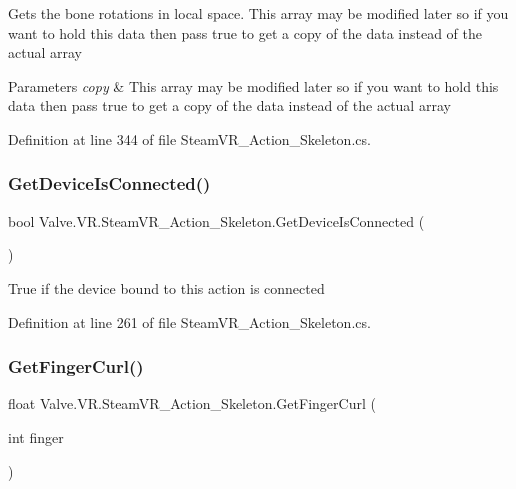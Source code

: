 Gets the bone rotations in local space. This array may be modified later so if you want to hold this data then pass true to get a copy of the data instead of the actual array 


\begin{DoxyParams}{Parameters}
{\em copy} & This array may be modified later so if you want to hold this data then pass true to get a copy of the data instead of the actual array\\
\hline
\end{DoxyParams}


Definition at line 344 of file Steam\+V\+R\+\_\+\+Action\+\_\+\+Skeleton.\+cs.

\mbox{\label{class_valve_1_1_v_r_1_1_steam_v_r___action___skeleton_a6d53ade526af866579c3d943ba60e6c6}} 
\subsubsection{\texorpdfstring{GetDeviceIsConnected()}{GetDeviceIsConnected()}}
{\footnotesize\ttfamily bool Valve.\+V\+R.\+Steam\+V\+R\+\_\+\+Action\+\_\+\+Skeleton.\+Get\+Device\+Is\+Connected (\begin{DoxyParamCaption}{ }\end{DoxyParamCaption})}



True if the device bound to this action is connected 



Definition at line 261 of file Steam\+V\+R\+\_\+\+Action\+\_\+\+Skeleton.\+cs.

\mbox{\label{class_valve_1_1_v_r_1_1_steam_v_r___action___skeleton_a25eafdaeaf33acc144644bf0e35c2384}} 
\subsubsection{\texorpdfstring{GetFingerCurl()}{GetFingerCurl()}\hspace{0.1cm}{\footnotesize\ttfamily [1/2]}}
{\footnotesize\ttfamily float Valve.\+V\+R.\+Steam\+V\+R\+\_\+\+Action\+\_\+\+Skeleton.\+Get\+Finger\+Curl (\begin{DoxyParamCaption}\item[{int}]{finger }\end{DoxyParamCaption})}



